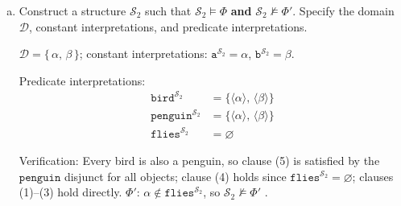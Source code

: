 {\begin{enumerate}[(a)]
\begin{sol}
Verification: (1) $\alpha \in \texttt{bird}^{\mathcal{S}_1}$ \checkmark;\; (2) $\beta \in \texttt{penguin}^{\mathcal{S}_1}$ \checkmark;\; (3) $\beta$ is a penguin and a bird \checkmark;\; (4) $\beta$ is a penguin but not in $\texttt{flies}^{\mathcal{S}_1}$ \checkmark;\; (5) $\alpha$ flies \checkmark, $\beta$ is a penguin \checkmark.\; $\Phi'$: $\alpha \in \texttt{flies}^{\mathcal{S}_1}$ \checkmark.
\end{sol}

\vspace{6mm}

\item \points[4] Construct a structure $\mathcal{S}_2$ such that $\mathcal{S}_2 \vDash \Phi$ \textbf{and} $\mathcal{S}_2 \not\vDash \Phi'$. Specify the domain $\mathcal{D}$, constant interpretations, and predicate interpretations.

\begin{sol}
$\mathcal{D} = \{\,\alpha,\, \beta\,\}$; constant interpretations: $\texttt{a}^{\mathcal{S}_2} = \alpha$,\; $\texttt{b}^{\mathcal{S}_2} = \beta$.

Predicate interpretations:
\begin{align*}
\texttt{bird}^{\mathcal{S}_2} &= \{\langle \alpha \rangle,\, \langle \beta \rangle\} \\
\texttt{penguin}^{\mathcal{S}_2} &= \{\langle \alpha \rangle,\, \langle \beta \rangle\} \\
\texttt{flies}^{\mathcal{S}_2} &= \varnothing
\end{align*}

Verification: Every bird is also a penguin, so clause (5) is satisfied by the $\texttt{penguin}$ disjunct for all objects; clause (4) holds since $\texttt{flies}^{\mathcal{S}_2} = \varnothing$; clauses (1)--(3) hold directly. $\Phi'$: $\alpha \notin \texttt{flies}^{\mathcal{S}_2}$, so $\mathcal{S}_2 \not\vDash \Phi'$ \checkmark.
\end{sol}

\end{enumerate}
}

\clearpage


